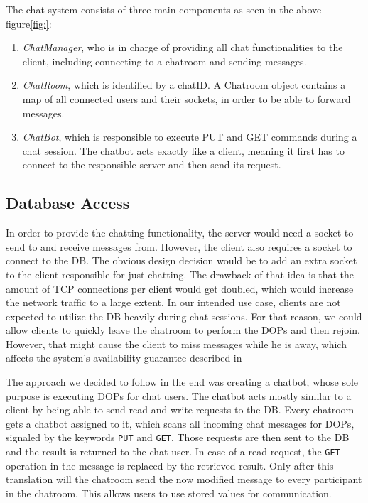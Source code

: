 The chat system consists of three main components as seen in the above figure\ref{fig:}:
\begin{enumerate}
	\item \textit{ChatManager}, who is in charge of providing all chat functionalities to the client, including connecting to a chatroom and sending messages.
	\item \textit{ChatRoom}, which is identified by a chatID. A Chatroom object contains a map of all connected users and their sockets, in order to be able to forward messages.
	\item \textit{ChatBot}, which is responsible to execute PUT and GET commands during a chat session. The chatbot acts exactly like a client, meaning it first has to connect to the responsible server and then send its request.

\end{enumerate}

\subsection{Database Access}
\label{sec:groupchat_chatbot}
In order to provide the chatting functionality, the server would need a socket to send to and receive messages from. However, the client also requires a socket to connect to the DB. The obvious design decision would be to add an extra socket to the client responsible for just chatting. The drawback of that idea is that the amount of TCP connections per client would get doubled, which would increase the network traffic to a large extent. In our intended use case, clients are not expected to utilize the DB heavily during chat sessions. For that reason, we could allow clients to quickly leave the chatroom to perform the DOPs and then rejoin. However, that might cause the client to miss messages while he is away, which affects the system's availability guarantee described in %

The approach we decided to follow in the end was creating a chatbot, whose sole purpose is executing DOPs for chat users. The chatbot acts mostly similar to a client by being able to send read and write requests to the DB. Every chatroom gets a chatbot assigned to it, which scans all incoming chat messages for DOPs, signaled by the keywords \texttt{PUT} and \texttt{GET}. Those requests are then sent to the DB and the result is returned to the chat user. In case of a read request, the \texttt{GET} operation in the message is replaced by the retrieved result. Only after this translation will the chatroom send the now modified message to every participant in the chatroom. This allows users to use stored values for communication.


